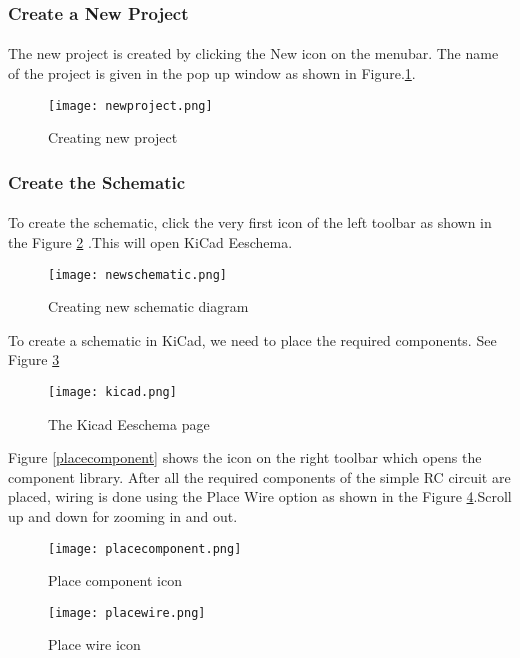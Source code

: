\subsubsection{Create a New Project}

\paragraph{ } The new project is created by clicking the New icon on the
menubar. The name of the project is given in the pop up window as shown in Figure.\ref{newproject}.
\begin{figure}[h]
\centering
\texttt{[image: newproject.png]}
\caption{Creating new project}
\label{newproject}
\end{figure}

\subsubsection{Create the Schematic}

\paragraph{}  To create the schematic, click the very first icon of the
left toolbar as shown in the Figure \ref{newschematic} .This will open KiCad Eeschema.


\begin{figure}[h]
\centering
\texttt{[image: newschematic.png]}
\caption{Creating new schematic diagram}
\label{newschematic}
\end{figure}

To create a schematic in KiCad, we need to place the required components. See Figure \ref{kicad}

\begin{figure}[h]
\centering
\texttt{[image: kicad.png]}
\caption{The Kicad Eeschema page}
\label{kicad}
\end{figure}

 Figure \ref{placecomponent}
shows the icon on the right toolbar which opens the component library. After all the required components of the simple RC circuit are placed, wiring is
done using the Place Wire option as shown in the Figure \ref{placewire}.Scroll up and down for zooming in and out.


\begin{figure}
\begin{minipage}{.5\textwidth}
  \centering
  \texttt{[image: placecomponent.png]}
  \caption{Place component icon}
  \label{placecomponent}
\end{minipage}%
\begin{minipage}{.5\textwidth}
  \centering
  \texttt{[image: placewire.png]}
  \caption{Place wire icon}
  \label{placewire}
\end{minipage}
\end{figure}


